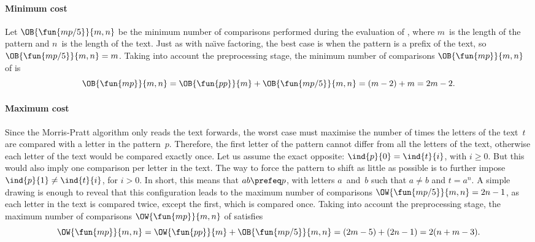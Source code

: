 \paragraph{Minimum cost}

Let
\(\smash[t]{\OB{\fun{mp/5}}{m,n}}\)
be the minimum number of comparisons performed during the evaluation
of , where \(m\)~is the length of the pattern and \(n\)~is
the length of the text. Just as with na\"{\i}ve factoring, the best
case is when the pattern is a prefix of the text, so
\(\OB{\fun{mp/5}}{m,n} = m\). Taking into account the preprocessing
stage, the minimum number of comparisons
\(\OB{\fun{mp}}{m,n}\) of
 is
\begin{equation*}
\belowdisplayskip=0pt
\OB{\fun{mp}}{m,n} = \OB{\fun{pp}}{m} + \OB{\fun{mp/5}}{m,n} = (m-2)
+ m = 2m - 2.
\end{equation*}

\vspace*{-10pt}

\paragraph{Maximum cost}

Since the Morris\hyp{}Pratt algorithm only reads the text forwards,
the worst case must maximise the number of times the letters of the
text~\(t\) are compared with a letter in the pattern~\(p\). Therefore,
the first letter of the pattern cannot differ from all the letters of
the text, otherwise each letter of the text would be compared exactly
once. Let us assume the exact opposite: \(\ind{p}{0} = \ind{t}{i}\),
with \(i \geqslant 0\). But this would also imply one comparison per
letter in the text. The way to force the pattern to shift as little as
possible is to further impose \(\ind{p}{1} \neq \ind{t}{i}\), for
\(i>0\). In short, this means that \(ab \prefeq p\), with letters
\(a\)~and~\(b\) such that \(a \neq b\) and \(t=a^n\). A simple
drawing is enough to reveal that this configuration leads to the
maximum number of comparisons \(\OW{\fun{mp/5}}{m,n} = 2n -
1\), as each letter in the text is
compared twice, except the first, which is compared once. Taking into
account the preprocessing stage, the maximum number of comparisons
\(\OW{\fun{mp}}{m,n}\)  of
 satisfies
\begin{equation*}
\belowdisplayskip=0pt
\OW{\fun{mp}}{m,n} = \OW{\fun{pp}}{m} + \OB{\fun{mp/5}}{m,n} = (2m-5)
+ (2n-1) = 2(n + m - 3).
\end{equation*}


